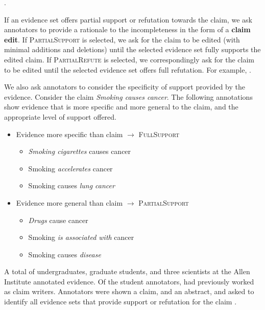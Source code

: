 .

If an evidence set offers partial support or refutation towards the claim, we ask annotators to provide a rationale to the incompleteness in the form of a \textbf{claim edit}. If \textsc{PartialSupport} is selected, we ask for the claim to be edited (with minimal additions and deletions) until the selected evidence set fully supports the edited claim. If \textsc{PartialRefute} is selected, we correspondingly ask for the claim to be edited until the selected evidence set offers full refutation. For example, .

We also ask annotators to consider the specificity of support provided by the evidence. Consider the claim \textit{Smoking causes cancer}. The following annotations show evidence that is more specific and more general to the claim, and the appropriate level of support offered.

\begin{itemize}
    \item Evidence more specific than claim $\to$ \mbox{\textsc{FullSupport}}
    \begin{itemize}
        \item \textit{Smoking cigarettes} causes cancer
        \item Smoking \textit{accelerates} cancer
        \item Smoking causes \textit{lung cancer}
    \end{itemize}

    \item Evidence more general than claim $\to$ \mbox{\textsc{PartialSupport}}
    \begin{itemize}
        \item \textit{Drugs} cause cancer
        \item Smoking \textit{is associated with} cancer
        \item Smoking causes \textit{disease}
    \end{itemize}
\end{itemize}

A total of \todo undergraduates, \todo graduate students, and three scientists at the Allen Institute annotated evidence. Of the student annotators, \todo had previously worked as claim writers. Annotators were shown a claim, and an abstract, and asked to identify all evidence sets that provide support or refutation for the claim .


